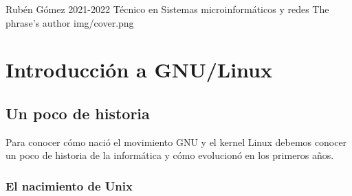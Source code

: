 \documentclass{../../../yukibook.cls/yukibook}
\begin{document}
  {Rubén Gómez}  %
  {2021-2022}    %
  {Técnico en Sistemas microinformáticos y redes} %
  {}	%
  {The phrase's author}	%
  {img/cover.png}



\chapter{Introducción a GNU/Linux}
\section{Un poco de historia}
Para conocer cómo nació el movimiento GNU y el kernel Linux debemos conocer un poco de historia de la informática y cómo evolucionó en los primeros años.

\subsection{El nacimiento de Unix}
\end{document}
